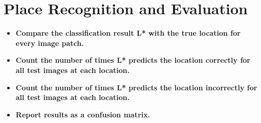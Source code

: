 \section{Place Recognition and Evaluation}
\begin{itemize}
 \item \textbf{Compare the classification result L* with the true location for every image patch.}
 \item  \textbf{Count the number of times L* predicts the location correctly for all test images at each location.}
 \item  \textbf{Count the number of times L* predicts the location incorrectly for all test images at each location.}
 \item  \textbf{Report results as a confusion matrix.}
\end{itemize}





